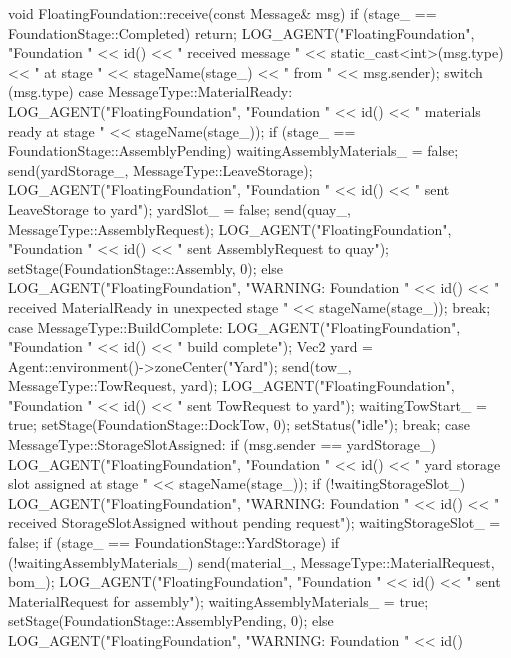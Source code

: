 \documentclass[10pt,letterpaper]{jsarticle}
\begin{document}
\begin{cppcode}
void FloatingFoundation::receive(const Message& msg) {
    if (stage_ == FoundationStage::Completed) return;
    LOG_AGENT("FloatingFoundation", "Foundation " << id() << " received message " << static_cast<int>(msg.type)
              << " at stage " << stageName(stage_) << " from " << msg.sender);
    switch (msg.type) {
    case MessageType::MaterialReady:
        LOG_AGENT("FloatingFoundation", "Foundation " << id() << " materials ready at stage "
                  << stageName(stage_));
        if (stage_ == FoundationStage::AssemblyPending) {
            waitingAssemblyMaterials_ = false;
            send(yardStorage_, MessageType::LeaveStorage);
            LOG_AGENT("FloatingFoundation", "Foundation " << id() << " sent LeaveStorage to yard");
            yardSlot_ = false;
            send(quay_, MessageType::AssemblyRequest);
            LOG_AGENT("FloatingFoundation", "Foundation " << id() << " sent AssemblyRequest to quay");
            setStage(FoundationStage::Assembly, 0);
        } else {
            LOG_AGENT("FloatingFoundation", "WARNING: Foundation " << id()
                      << " received MaterialReady in unexpected stage " << stageName(stage_));
        }
        break;
    case MessageType::BuildComplete: {
        LOG_AGENT("FloatingFoundation", "Foundation " << id() << " build complete");
        Vec2 yard = Agent::environment()->zoneCenter("Yard");
        send(tow_, MessageType::TowRequest, yard);
        LOG_AGENT("FloatingFoundation", "Foundation " << id() << " sent TowRequest to yard");
        waitingTowStart_ = true;
        setStage(FoundationStage::DockTow, 0);
        setStatus("idle");
        break;
    }
    case MessageType::StorageSlotAssigned:
        if (msg.sender == yardStorage_) {
            LOG_AGENT("FloatingFoundation", "Foundation " << id() << " yard storage slot assigned at stage "
                      << stageName(stage_));
            if (!waitingStorageSlot_) {
                LOG_AGENT("FloatingFoundation", "WARNING: Foundation " << id() << " received StorageSlotAssigned without pending request");
            }
            waitingStorageSlot_ = false;
            if (stage_ == FoundationStage::YardStorage) {
                if (!waitingAssemblyMaterials_) {
                    send(material_, MessageType::MaterialRequest, bom_);
                    LOG_AGENT("FloatingFoundation", "Foundation " << id() << " sent MaterialRequest for assembly");
                    waitingAssemblyMaterials_ = true;
                    setStage(FoundationStage::AssemblyPending, 0);
                } else {
                    LOG_AGENT("FloatingFoundation", "WARNING: Foundation " << id()
}}}}}
\end{cppcode}
\end{document}
